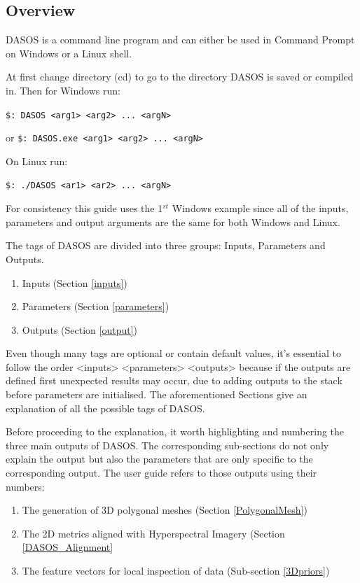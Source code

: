 \documentclass{subfiles}
\begin{document}
	\subsection{Overview}\label{Overview}
	\par DASOS is a command line program and can either be used in Command Prompt on Windows or a Linux shell. 
	\par At first change directory (cd) to go to the directory DASOS is saved or compiled in. 
	Then for Windows run: 
	\par \verb|$: DASOS <arg1> <arg2> ... <argN>|
	\par or \verb|$: DASOS.exe <arg1> <arg2> ... <argN>|
	\par On Linux run:
	\par \verb|$: ./DASOS <ar1> <ar2> ... <argN>|
	\par For consistency this guide uses the 1$^{st}$ Windows example since all of the inputs, parameters and output arguments are the same for both Windows and Linux. 
	
	\par The tags of DASOS are divided into three groups: Inputs, Parameters and Outputs. 
		\begin{enumerate}
			\item Inputs (Section \ref{inputs})
			\item Parameters (Section \ref{parameters})
			\item Outputs (Section \ref{output})
		\end{enumerate} 
	\par Even though many tags are optional or contain default values, it's essential to follow the order <inputs> <parameters> <outputs> because if the outputs are defined first unexpected results may occur, due to adding outputs to the stack before parameters are initialised. The aforementioned Sections give an explanation of all the possible tags of DASOS. 
	
	\par Before proceeding to the explanation, it worth highlighting and numbering the three main outputs of DASOS. The corresponding sub-sections do not only explain the output but also the parameters that are only specific to the corresponding output. The user guide refers to those outputs using their numbers:
	
	\begin{enumerate}
			\item The generation of 3D polygonal meshes (Section \ref{PolygonalMesh})
			\item The 2D metrics aligned with Hyperspectral Imagery (Section \ref{DASOS_Alignment}
			\item The feature vectors for local inspection of data (Sub-section \ref{3Dpriors})		
	\end{enumerate}
	
\end{document}
